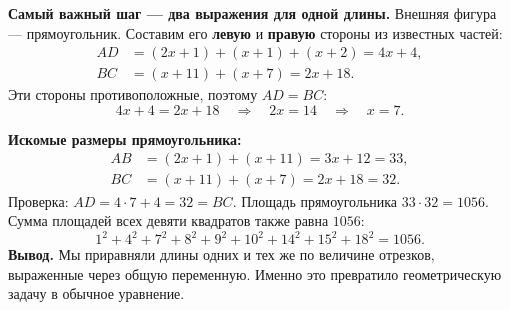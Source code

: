 \documentclass[a4paper,12pt]{article}
\newcommand{\tagline}[1]{\textcolor{darkaccent}{\textbf{#1}}}
\begin{document}
\tagline{Самый важный шаг --- два выражения для одной длины.}
Внешняя фигура --- прямоугольник. Составим его \textbf{левую} и \textbf{правую} стороны из известных частей:
\begin{align*}
 AD&=(2x+1)+(x+1)+(x+2)=4x+4,\\
 BC&=(x+11)+(x+7)=2x+18.
\end{align*}
Эти стороны противоположные, поэтому $AD=BC$:
\[
4x+4=2x+18\quad\Longrightarrow\quad 2x=14\quad\Longrightarrow\quad\boxed{x=7}.
\]

\tagline{Искомые размеры прямоугольника:}
\begin{align*}
AB&=(2x+1)+(x+11)=3x+12=\boxed{33},\\
BC&=(x+11)+(x+7)=2x+18=\boxed{32}.
\end{align*}
Проверка: $AD=4\cdot7+4=32=BC$. Площадь прямоугольника $33\cdot32=1056$. Сумма площадей всех девяти квадратов также равна $1056$:
\[
1^2+4^2+7^2+8^2+9^2+10^2+14^2+15^2+18^2=1056.
\]
\textcolor{darkaccent}{\textbf{Вывод.}} Мы приравняли длины одних и тех же по величине отрезков, выраженные через общую переменную. Именно это превратило геометрическую задачу в обычное уравнение.
\clearpage
\end{document}
